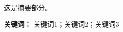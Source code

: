 \begin{abstractCN}
这是摘要部分。

\vspace{1cm}
\noindent
\textbf{关键词：} 关键词1；关键词2；关键词3
\end{abstractCN}

\newpage
